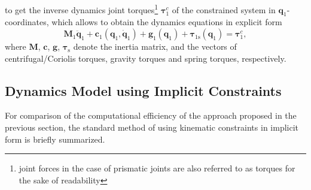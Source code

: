 \documentclass{svproc}
\newcommand{\bm}[1]{\boldsymbol{#1}}
\begin{document}
%
to get the inverse dynamics joint torques\footnote{joint forces in the case of prismatic joints are also referred to as torques for the sake of readability} $\bm{\tau}^c_1$ of the constrained system in $\bm{q}_1$-coordinates, which allows to obtain the dynamics equations in explicit form
%
\begin{equation}
\bm{M}_1\ddot{\bm{q}}_1+\bm{c}_1(\bm{q}_1,\dot{\bm{q}}_1)+\bm{g}_1(\bm{q}_1) + \bm{\tau}_{1\mathrm{s}}(\bm{q}_1) = \bm{\tau}^c_1,
\label{equ:Dyn_MinKoord}
\end{equation}
%
where $\bm{M}$, $\bm{c}$, $\bm{g}$, $\bm{\tau}_{\mathrm{s}}$ denote the inertia matrix, and the vectors of centrifugal/Coriolis torques, gravity torques and spring torques, respectively.

%


\subsection{Dynamics Model using Implicit Constraints}
\label{sec:DynamicsImpl}

For comparison of the computational efficiency of the approach proposed in the previous section, the standard method \cite{NakamuraGho1989,ParkChoPlo1999,KhalilBen1995,SaminFis2013} of using kinematic constraints in implicit form is briefly summarized.
\end{document}

